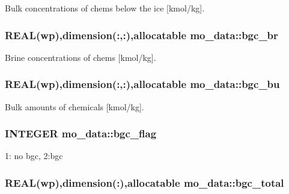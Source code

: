 Bulk concentrations of chems below the ice \mbox{[}kmol/kg\mbox{]}. 

\hypertarget{namespacemo__data_a8c950715d79f982020fbc43ec03a02e8}{
\subsubsection[{bgc\_\-br}]{\setlength{\rightskip}{0pt plus 5cm}REAL(wp),dimension(:,:),allocatable {\bf mo\_\-data::bgc\_\-br}}}
\label{namespacemo__data_a8c950715d79f982020fbc43ec03a02e8}


Brine concentrations of chems \mbox{[}kmol/kg\mbox{]}. 

\hypertarget{namespacemo__data_a92107cbfdb8869916b149d942db53cad}{
\subsubsection[{bgc\_\-bu}]{\setlength{\rightskip}{0pt plus 5cm}REAL(wp),dimension(:,:),allocatable {\bf mo\_\-data::bgc\_\-bu}}}
\label{namespacemo__data_a92107cbfdb8869916b149d942db53cad}


Bulk amounts of chemicals \mbox{[}kmol/kg\mbox{]}. 

\hypertarget{namespacemo__data_a962bc540d1c63b9ff3b571c91133070b}{
\subsubsection[{bgc\_\-flag}]{\setlength{\rightskip}{0pt plus 5cm}INTEGER {\bf mo\_\-data::bgc\_\-flag}}}
\label{namespacemo__data_a962bc540d1c63b9ff3b571c91133070b}


1: no bgc, 2:bgc 

\hypertarget{namespacemo__data_a15d6538801561a4daac86ca856ff99c5}{
\subsubsection[{bgc\_\-total}]{\setlength{\rightskip}{0pt plus 5cm}REAL(wp),dimension(:),allocatable {\bf mo\_\-data::bgc\_\-total}}}
\label{namespacemo__data_a15d6538801561a4daac86ca856ff99c5}


